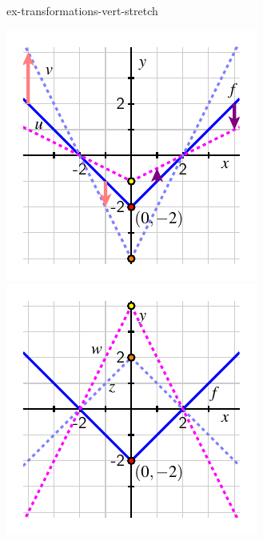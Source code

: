 \documentclass{ximera}
\begin{document}
\begin{example}{}{ex-transformations-vert-stretch}
\begin{image}
\includegraphics[width=1\linewidth]{images/transformations-vert-stretch-1}
\includegraphics[width=1\linewidth]{images/transformations-vert-stretch-2}
\end{image}











\end{example}
\end{document}
